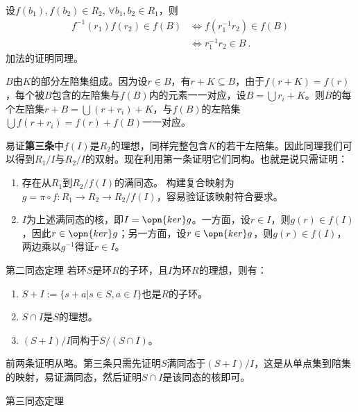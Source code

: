 设$f(b_1),f(b_2)\in R_2,\,\forall b_1,b_2\in R_1$，则
\begin{equation}
\begin{aligned}
f^{-1}(r_1)f(r_2)\in f(B)&\Leftrightarrow f(r_1^{-1}r_2)\in f(B)\\
&\Leftrightarrow r_1^{-1}r_2\in B~.
\end{aligned}
\end{equation}
加法的证明同理。

$B$由$K$的部分左陪集组成。因为设$r\in B$，有$r+K\subseteq B$，由于$f(r+K)=f(r)$，每个被$B$包含的左陪集与$f(B)$内的元素一一对应，设$B=\bigcup r_i+K$。则$B$的每个左陪集$r+B=\bigcup (r+r_i)+K$，与$f(B)$的左陪集$\bigcup f(r+r_i)=f(r)+f(B)$一一对应。

易证\textbf{第三条}中$f(I)$是$R_2$的理想，同样完整包含$K$的若干左陪集。因此同理我们可以得到$R_1/I$与$R_2/I$的双射。现在利用第一条证明它们同构。也就是说只需证明：
\begin{enumerate}
\item 存在从$R_1$到$R_2/f(I)$的满同态。
构建复合映射为$g=\pi\circ f:R_1\rightarrow R_2\rightarrow R_2/f(I)$，容易验证该映射符合要求。
\item $I$为上述满同态的核，即$I=\opn{ker}g$。一方面，设$r\in I$，则$g(r)\in f(I)$，因此$r\in \opn{ker}g$；另一方面，设$r\in \opn{ker}g$，则$g(r)\in f(I)$，两边乘以$g^{-1}$得证$r\in I$。
\end{enumerate}
\begin{theorem}{第二同态定理}
若环$S$是环$R$的子环，且$I$为环$R$的理想，则有：
\begin{enumerate}
\item $S+I:=\{s+a|s\in S,a\in I\}$也是$R$的子环。
\item $S\cap I$是$S$的理想。
\item $(S+I)/I$同构于$S/(S\cap I)$。
\end{enumerate}
\end{theorem}
前两条证明从略。第三条只需先证明$S$满同态于$(S+I)/I$，这是从单点集到陪集的映射，易证满同态，然后证明$S\cap I$是该同态的核即可。
\begin{theorem}{第三同态定理}

\end{theorem}



